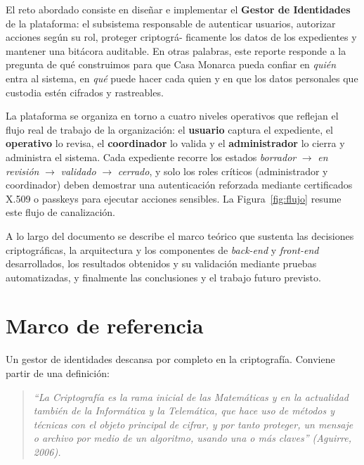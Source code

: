 \documentclass[10pt,letterpaper]{report}
\newenvironment{citaliteral}
  {\begin{quote}\itshape\color{citblue}}
  {\end{quote}}
\renewcommand{\_}{\textunderscore\allowbreak}
\begin{document}
El reto abordado consiste en dise\~nar e implementar el
\textbf{Gestor de Identidades} de la plataforma: el subsistema responsable de
autenticar usuarios, autorizar acciones seg\'un su rol, proteger criptogr\'a-
ficamente los datos de los expedientes y mantener una bit\'acora auditable. En
otras palabras, este reporte responde a la pregunta de qu\'e construimos para que
Casa Monarca pueda confiar en \textit{qui\'en} entra al sistema, en \textit{qu\'e}
puede hacer cada quien y en que los datos personales que custodia est\'en
cifrados y rastreables.

La plataforma se organiza en torno a cuatro niveles operativos que reflejan el
flujo real de trabajo de la organizaci\'on: el \textbf{usuario} captura el
expediente, el \textbf{operativo} lo revisa, el \textbf{coordinador} lo valida y
el \textbf{administrador} lo cierra y administra el sistema. Cada expediente
recorre los estados \textit{borrador} $\rightarrow$ \textit{en revisi\'on}
$\rightarrow$ \textit{validado} $\rightarrow$ \textit{cerrado}, y solo los roles
cr\'iticos (administrador y coordinador) deben demostrar una autenticaci\'on
reforzada mediante certificados X.509 o passkeys para ejecutar acciones
sensibles. La Figura~\ref{fig:flujo} resume este flujo de canalizaci\'on.

A lo largo del documento se describe el marco te\'orico que sustenta las
decisiones criptogr\'aficas, la arquitectura y los componentes de \textit{back-end}
y \textit{front-end} desarrollados, los resultados obtenidos y su validaci\'on
mediante pruebas automatizadas, y finalmente las conclusiones y el trabajo
futuro previsto.

\chapter{Marco de referencia}

Un gestor de identidades descansa por completo en la criptograf\'ia. Conviene
partir de una definici\'on:

\begin{citaliteral}
``La Criptograf\'ia es la rama inicial de las Matem\'aticas y en la actualidad
tambi\'en de la Inform\'atica y la Telem\'atica, que hace uso de m\'etodos y
t\'ecnicas con el objeto principal de cifrar, y por tanto proteger, un mensaje o
archivo por medio de un algoritmo, usando una o m\'as claves'' (Aguirre, 2006).
\end{citaliteral}
\end{document}
